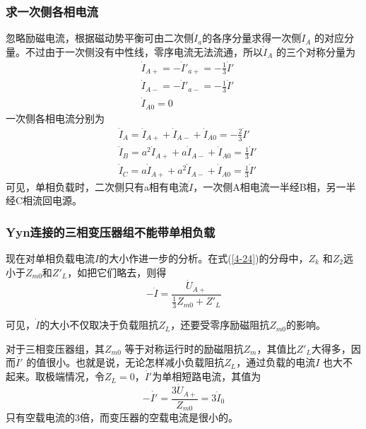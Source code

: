 \documentclass{book}
\begin{document}
\subsubsection{求一次侧各相电流}
忽略励磁电流，根据磁动势平衡可由二次侧${{\dot{I}}_{a}}$的各序分量求得一次侧${{\dot{I}}_{A}}$ 的对应分量。不过由于一次侧没有中性线，零序电流无法流通，所以${{\dot{I}}_{A}}$ 的三个对称分量为
\begin{align}
& {{{\dot{I}}}_{A+}}=-{{{{\dot{I}}'}}_{a+}}=-\frac{1}{3}{\dot{I}}' \\ 
& {{{\dot{I}}}_{A-}}=-{{{{\dot{I}}'}}_{a-}}=-\frac{1}{3}{\dot{I}}' \\ 
& {{{\dot{I}}}_{A0}}=0
\label{4-25}
\end{align}	
一次侧各相电流分别为
\begin{align}
& {{{\dot{I}}}_{A}}={{{\dot{I}}}_{A+}}+{{{\dot{I}}}_{A-}}+{{{\dot{I}}}_{A0}}=-\frac{2}{3}{\dot{I}}' \\ 
& {{{\dot{I}}}_{B}}={{a}^{2}}{{{\dot{I}}}_{A+}}+a{{{\dot{I}}}_{A-}}+{{{\dot{I}}}_{A0}}=\frac{1}{3}{\dot{I}}' \\ 
& {{{\dot{I}}}_{C}}=a{{{\dot{I}}}_{A+}}+{{a}^{2}}{{{\dot{I}}}_{A-}}+{{{\dot{I}}}_{A0}}=\frac{1}{3}{\dot{I}}'
\label{4-26}
\end{align}	
可见，单相负载时，二次侧只有a相有电流$\dot{I}$，一次侧A相电流一半经B相，另一半经C相流回电源。

\subsubsection{Yyn连接的三相变压器组不能带单相负载}

现在对单相负载电流$I$的大小作进一步的分析。在式(\ref{4-24})的分母中，${{Z}_{k}}$ 和${{Z}_{2}}$远小于${{Z}_{m0}}$和${{{Z}'}_{L}}$，如把它们略去，则得
\begin{equation}
-\dot{I}=\frac{{{{\dot{U}}}_{A+}}}{\frac{1}{3}{{Z}_{m0}}+{{{{Z}'}}_{L}}}
\label{4-27}
\end{equation}

可见，$\dot{I}$的大小不仅取决于负载阻抗${{Z}_{L}}$，还要受零序励磁阻抗${{Z}_{m0}}$的影响。

对于三相变压器组，其${{Z}_{m0}}$ 等于对称运行时的励磁阻抗${{Z}_{m}}$，其值比${{{Z}'}_{L}}$大得多，因而$\dot{{I}'}$ 的值很小。也就是说，无论怎样减小负载阻抗${{Z}_{L}}$，通过负载的电流$I$ 也大不起来。取极端情况，令${{Z}_{L}}=0$，$\dot{{I}'}$为单相短路电流，其值为
\begin{equation}
-\dot{{I}'}=\frac{3{{{\dot{U}}}_{A+}}}{{{Z}_{m0}}}=3{{\dot{I}}_{0}}
\label{4-28}
\end{equation}
只有空载电流的3倍，而变压器的空载电流是很小的。
\end{document}
